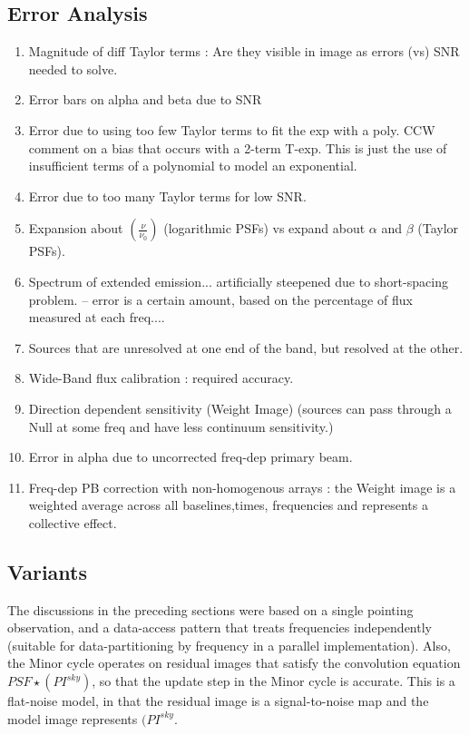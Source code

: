 \documentclass[structabstract]{aa}
\newcommand{\nuno}{{\left(\frac{\nu}{\nu_0}\right)}}
\begin{document}
\subsection{Error Analysis}
\begin{enumerate}
\item Magnitude of diff Taylor terms :
Are they visible in image as errors (vs) SNR needed to solve.
\item Error bars on alpha and beta due to SNR
\item Error due to using too few Taylor terms to fit the exp with a poly.
CCW comment on a bias that occurs with a 2-term T-exp. This is just the use of insufficient terms of a polynomial to model an exponential.
\item Error due to too many Taylor terms for low SNR.
\item Expansion about $\nuno$ (logarithmic PSFs)
vs expand about $\alpha$ and $\beta$ (Taylor PSFs).
\item Spectrum of extended emission... artificially steepened due to short-spacing problem.
-- error is a certain amount, based on the percentage of flux measured at each freq.... 
\item Sources that are unresolved at one end of the band, but resolved at the other.
\item Wide-Band flux calibration : required accuracy.
\item Direction dependent sensitivity (Weight Image) (sources can pass through a Null at some freq and have less continuum sensitivity.)
\item Error in alpha due to uncorrected freq-dep primary beam.
\item Freq-dep PB correction with non-homogenous arrays : the Weight image is a weighted average
across all baselines,times, frequencies and represents a collective effect.
\end{enumerate}


\subsection{Variants}\label{VARIANTS}
The discussions in the preceding sections were based on a single pointing observation,
and a data-access pattern that treats frequencies independently (suitable for
data-partitioning by frequency in a parallel implementation). Also, the Minor cycle
operates on residual images that satisfy the convolution equation $PSF \star (P I^{sky})$, 
so that the update step in the Minor cycle is accurate. This is a flat-noise model, in that
the residual image is a signal-to-noise map and the model image represents $(P I^{sky}$.
\end{document}
